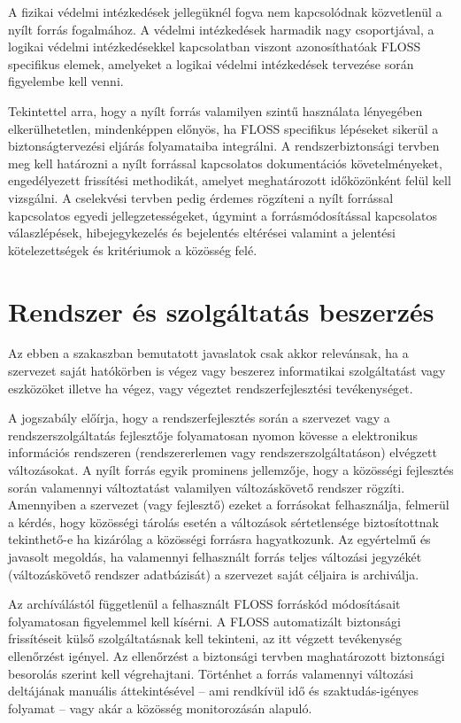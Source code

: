 \documentclass[12pt,magyar,a4paper,oneside]{scrreprt}
\begin{document}
A fizikai védelmi intézkedések jellegüknél fogva nem kapcsolódnak
közvetlenül a nyílt forrás fogalmához. A védelmi intézkedések harmadik
nagy csoportjával, a logikai védelmi intézkedésekkel kapcsolatban
viszont azonosíthatóak FLOSS specifikus elemek, amelyeket a logikai
védelmi intézkedések tervezése során figyelembe kell venni.

Tekintettel arra, hogy a nyílt forrás valamilyen szintű használata
lényegében elkerülhetetlen, mindenképpen előnyös, ha FLOSS specifikus
lépéseket sikerül a biztonságtervezési eljárás folyamataiba integrálni.
A rendszerbiztonsági tervben meg kell határozni a nyílt forrással
kapcsolatos dokumentációs követelményeket, engedélyezett frissítési
methodikát, amelyet meghatározott időközönként felül kell vizsgálni. A
cselekvési tervben pedig érdemes rögzíteni a nyílt forrással kapcsolatos
egyedi jellegzetességeket, úgymint a forrásmódosítással kapcsolatos
válaszlépések, hibejegykezelés és bejelentés eltérései valamint a
jelentési kötelezettségek és kritériumok a közösség felé.

\hypertarget{rendszer-uxe9s-szolguxe1ltatuxe1s-beszerzuxe9s-1}{%
\section{Rendszer és szolgáltatás
beszerzés}\label{rendszer-uxe9s-szolguxe1ltatuxe1s-beszerzuxe9s-1}}

Az ebben a szakaszban bemutatott javaslatok csak akkor relevánsak, ha a
szervezet saját hatókörben is végez vagy beszerez informatikai
szolgáltatást vagy eszközöket illetve ha végez, vagy végeztet
rendszerfejlesztési tevékenységet.

A jogszabály előírja, hogy a rendszerfejlesztés során a szervezet vagy a
rendszerszolgáltatás fejlesztője folyamatosan nyomon kövesse a
elektronikus információs rendszeren (rendszererlemen vagy
rendszerszolgáltatáson) elvégzett változásokat. A nyílt forrás egyik
prominens jellemzője, hogy a közösségi fejlesztés során valamennyi
változtatást valamilyen változáskövető rendszer rögzíti. Amennyiben a
szervezet (vagy fejlesztő) ezeket a forrásokat felhasználja, felmerül a
kérdés, hogy közösségi tárolás esetén a változások sértetlensége
biztosítottnak tekinthető-e ha kizárólag a közösségi forrásra
hagyatkozunk. Az egyértelmű és javasolt megoldás, ha valamennyi
felhasznált forrás teljes változási jegyzékét (változáskövető rendszer
adatbázisát) a szervezet saját céljaira is archiválja.

Az archíválástól függetlenül a felhasznált FLOSS forráskód módosításait
folyamatosan figyelemmel kell kísérni. A FLOSS automatizált biztonsági
frissítéseit külső szolgáltatásnak kell tekinteni, az itt végzett
tevékenység ellenőrzést igényel. Az ellenőrzést a biztonsági tervben
maghatározott biztonsági besorolás szerint kell végrehajtani. Történhet
a forrás valamennyi változási deltájának manuális áttekintésével -- ami
rendkívül idő és szaktudás-igényes folyamat -- vagy akár a közösség
monitorozásán alapuló.
\end{document}
